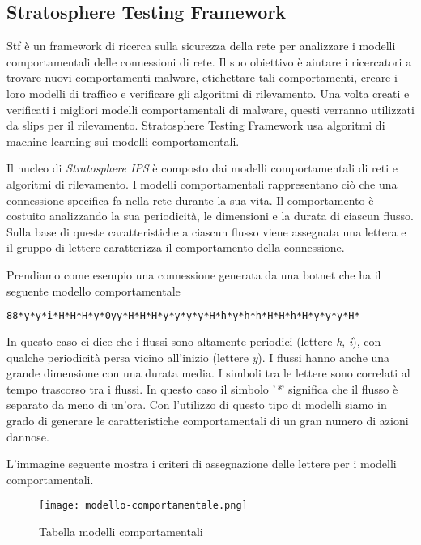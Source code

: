 \documentclass[../main.tex]{subfiles}
\begin{document}
\subsection{Stratosphere Testing Framework}
Stf è un framework di ricerca sulla sicurezza della rete per analizzare i modelli comportamentali delle connessioni di rete. Il suo obiettivo è aiutare i ricercatori a trovare nuovi comportamenti malware, etichettare tali comportamenti, creare i loro modelli di traffico e verificare gli algoritmi di rilevamento. Una volta creati e verificati i migliori modelli comportamentali di malware, questi verranno utilizzati da slips per il rilevamento. Stratosphere Testing Framework usa algoritmi di machine learning sui modelli comportamentali.

Il nucleo di \textit{Stratosphere IPS} è composto dai modelli comportamentali di reti e algoritmi di rilevamento. I modelli comportamentali rappresentano ciò che una connessione specifica fa nella rete durante la sua vita. Il comportamento è costuito analizzando la sua periodicità, le dimensioni e la durata di ciascun flusso. Sulla base di queste caratteristiche a ciascun flusso viene assegnata una lettera e il gruppo di lettere caratterizza il comportamento della connessione.

Prendiamo come esempio una connessione generata da una botnet che ha il seguente modello comportamentale
\begin{lstlisting}[language=bash]
88*y*y*i*H*H*H*y*0yy*H*H*H*y*y*y*y*H*h*y*h*h*H*H*h*H*y*y*y*H*
\end{lstlisting}

In questo caso ci dice che i flussi sono altamente periodici (lettere \textit{h}, \textit{i}), con qualche periodicità persa vicino all'inizio (lettere \textit{y}). I flussi hanno anche una grande dimensione con una durata media. I simboli tra le lettere sono correlati al tempo trascorso tra i flussi. In questo caso il simbolo '\textit{*}' significa che il flusso è separato da meno di un'ora.
Con l'utilizzo di questo tipo di modelli siamo in grado di generare le caratteristiche comportamentali di un gran numero di azioni dannose. 

L'immagine seguente mostra i criteri di assegnazione delle lettere per i modelli comportamentali.

\begin{figure}[H]
\centering
\texttt{[image: modello-comportamentale.png]}
				\caption{Tabella modelli comportamentali}
\end{figure}
\end{document}
